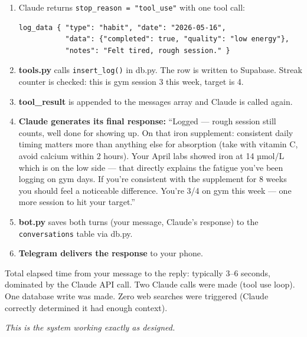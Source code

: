 \documentclass[12pt, a4paper]{article}
\begin{document}
\begin{enumerate}
    \item Claude returns \texttt{stop\_reason = "tool\_use"} with one tool call:
    \begin{lstlisting}
log_data { "type": "habit", "date": "2026-05-16",
           "data": {"completed": true, "quality": "low energy"},
           "notes": "Felt tired, rough session." }
    \end{lstlisting}

    \item \textbf{tools.py} calls \texttt{insert\_log()} in db.py. The row is written to Supabase. Streak counter is checked: this is gym session 3 this week, target is 4.

    \item \textbf{tool\_result} is appended to the messages array and Claude is called again.

    \item \textbf{Claude generates its final response:} ``Logged --- rough session still counts, well done for showing up. On that iron supplement: consistent daily timing matters more than anything else for absorption (take with vitamin C, avoid calcium within 2 hours). Your April labs showed iron at 14 µmol/L which is on the low side --- that directly explains the fatigue you've been logging on gym days. If you're consistent with the supplement for 8 weeks you should feel a noticeable difference. You're 3/4 on gym this week --- one more session to hit your target.''

    \item \textbf{bot.py} saves both turns (your message, Claude's response) to the \texttt{conversations} table via db.py.

    \item \textbf{Telegram delivers the response} to your phone.
\end{enumerate}

Total elapsed time from your message to the reply: typically 3--6 seconds, dominated by the Claude API call. Two Claude calls were made (tool use loop). One database write was made. Zero web searches were triggered (Claude correctly determined it had enough context).

\textit{This is the system working exactly as designed.}
\end{document}
